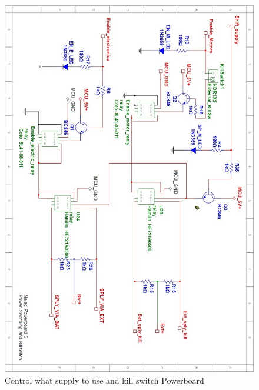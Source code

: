 \begin{figure}[!ht]
	\begin{center}
		\includegraphics[width=13.2cm]{./Images/Powerboard_Scematics/Switching.jpg}
		\caption{Control what supply to use and kill switch Powerboard}
	\end{center}
\end{figure}


